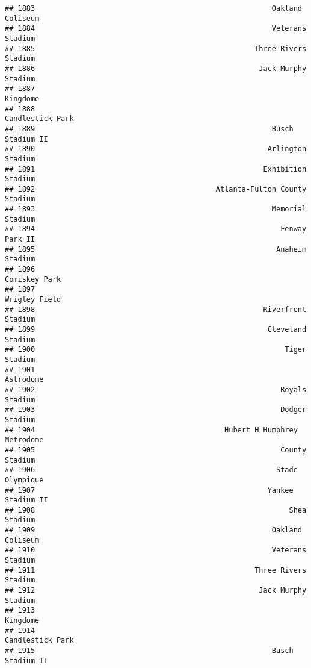 \documentclass[]{article}
\begin{document}
\begin{verbatim}
## 1883                                                       Oakland Coliseum
## 1884                                                       Veterans Stadium
## 1885                                                   Three Rivers Stadium
## 1886                                                    Jack Murphy Stadium
## 1887                                                               Kingdome
## 1888                                                       Candlestick Park
## 1889                                                       Busch Stadium II
## 1890                                                      Arlington Stadium
## 1891                                                     Exhibition Stadium
## 1892                                          Atlanta-Fulton County Stadium
## 1893                                                       Memorial Stadium
## 1894                                                         Fenway Park II
## 1895                                                        Anaheim Stadium
## 1896                                                          Comiskey Park
## 1897                                                          Wrigley Field
## 1898                                                     Riverfront Stadium
## 1899                                                      Cleveland Stadium
## 1900                                                          Tiger Stadium
## 1901                                                              Astrodome
## 1902                                                         Royals Stadium
## 1903                                                         Dodger Stadium
## 1904                                            Hubert H Humphrey Metrodome
## 1905                                                         County Stadium
## 1906                                                        Stade Olympique
## 1907                                                      Yankee Stadium II
## 1908                                                           Shea Stadium
## 1909                                                       Oakland Coliseum
## 1910                                                       Veterans Stadium
## 1911                                                   Three Rivers Stadium
## 1912                                                    Jack Murphy Stadium
## 1913                                                               Kingdome
## 1914                                                       Candlestick Park
## 1915                                                       Busch Stadium II

\end{verbatim}
\end{document}
